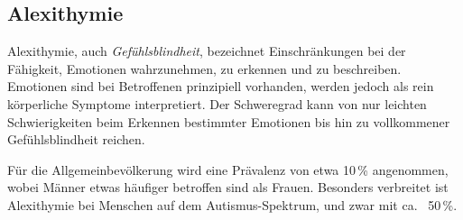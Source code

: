 \subsection{Alexithymie}
\label{alexithymie}

Alexithymie, auch \emph{Gefühlsblindheit}, bezeichnet Einschränkungen bei der Fähigkeit, Emotionen wahrzunehmen, zu erkennen und zu beschreiben. Emotionen sind bei Betroffenen prinzipiell vorhanden, werden jedoch als rein körperliche Symptome interpretiert. Der Schweregrad kann von nur leichten Schwierigkeiten beim Erkennen bestimmter Emotionen bis hin zu vollkommener \glqq Gefühlsblindheit\grqq{} reichen.

Für die Allgemeinbevölkerung wird eine Prävalenz von etwa 10\,\% angenommen, wobei Männer etwas häufiger betroffen sind als Frauen. Besonders verbreitet ist Alexithymie bei Menschen auf dem Autismus-Spektrum, und zwar mit ca.~ 50\,\%.
